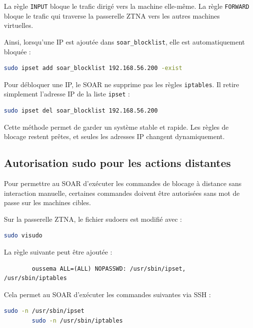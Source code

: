 \documentclass[12pt,a4paper,oneside]{report}
\begin{document}
    La règle \texttt{INPUT} bloque le trafic dirigé vers la machine elle-même. La règle \texttt{FORWARD} bloque le trafic qui traverse la passerelle ZTNA vers les autres machines virtuelles.
    
    Ainsi, lorsqu'une IP est ajoutée dans \texttt{soar\_blocklist}, elle est automatiquement bloquée :
    
    \begin{lstlisting}[language=bash]
    	sudo ipset add soar_blocklist 192.168.56.200 -exist
    \end{lstlisting}
    
    Pour débloquer une IP, le SOAR ne supprime pas les règles \texttt{iptables}. Il retire simplement l'adresse IP de la liste \texttt{ipset} :
    
    \begin{lstlisting}[language=bash]
    	sudo ipset del soar_blocklist 192.168.56.200
    \end{lstlisting}
    
    Cette méthode permet de garder un système stable et rapide. Les règles de blocage restent prêtes, et seules les adresses IP changent dynamiquement.
    
    \subsection{Autorisation sudo pour les actions distantes}
    
    Pour permettre au SOAR d'exécuter les commandes de blocage à distance sans interaction manuelle, certaines commandes doivent être autorisées sans mot de passe sur les machines cibles.
    
    Sur la passerelle ZTNA, le fichier sudoers est modifié avec :
    
    \begin{lstlisting}[language=bash]
    	sudo visudo
    \end{lstlisting}
    
    La règle suivante peut être ajoutée :
    
    \begin{lstlisting}
    	oussema ALL=(ALL) NOPASSWD: /usr/sbin/ipset, /usr/sbin/iptables
    \end{lstlisting}
    
    Cela permet au SOAR d'exécuter les commandes suivantes via SSH :
    
    \begin{lstlisting}[language=bash]
    	sudo -n /usr/sbin/ipset
    	sudo -n /usr/sbin/iptables
    \end{lstlisting}
    
\end{document}
